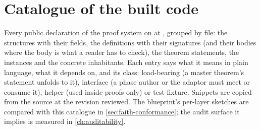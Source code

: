 \chapter{Catalogue of the built code}\label{ch:catalogue}

Every public declaration of the proof system on  at , grouped by file:
the structures with their fields, the definitions with their signatures (and their bodies where
the body is what a reader has to check), the theorem statements, the instances and the concrete
inhabitants. Each entry says what it means in plain language, what it depends on, and its
class: \textsf{load-bearing} (a master theorem's statement unfolds to it), \textsf{interface}
(a phase author or the adaptor must meet or consume it), \textsf{helper} (used inside proofs
only) or \textsf{test fixture}. Snippets are copied from the source at the revision reviewed.
The blueprint's per-layer sketches are compared with this catalogue in
\cref{sec:faith-conformance}; the audit surface it implies is measured in \cref{ch:auditability}.




\label{sec:cat-statements}
